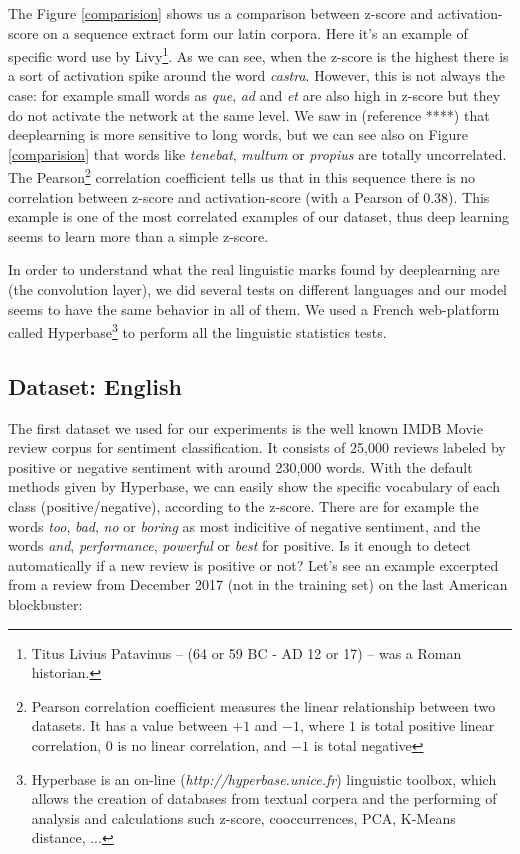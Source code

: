 The Figure \ref{comparision} shows us a comparison between z-score and activation-score on a sequence extract form our latin corpora. Here it's an example of specific word use by Livy\footnote{Titus Livius Patavinus -- (64 or 59 BC - AD 12 or 17) -- was a Roman historian.}. As we can see, when the z-score is the highest there is a sort of activation spike around the word \textit{castra}. However, this is not always the case: for example small words as \textit{que}, \textit{ad} and \textit{et} are also high in z-score but they do not activate the network at the same level. We saw in (reference ****) that deeplearning is more sensitive to long words, but we can see also on Figure \ref{comparision} that words like \textit{tenebat}, \textit{multum} or \textit{propius} are totally uncorrelated. The Pearson\footnote{Pearson correlation coefficient measures the linear relationship between two datasets. It has a value between $+1$ and $-1$, where $1$ is total positive linear correlation, $0$ is no linear correlation, and $-1$ is total negative} correlation coefficient tells us that in this sequence there is no correlation between z-score and activation-score (with a Pearson of 0.38). This example is one of the most correlated examples of our dataset, thus deep learning seems to learn more than a simple z-score.

In order to understand what the real linguistic marks found by deeplearning are (the convolution layer), we did several tests on different languages and our model seems to have the same behavior in all of them. We used a French web-platform called Hyperbase\footnote{Hyperbase is an on-line (\textit{http://hyperbase.unice.fr}) linguistic toolbox, which allows the creation of databases from textual corpera and the performing of analysis and calculations such z-score, cooccurrences, PCA, K-Means distance, ... } to perform all the linguistic statistics tests. 

\subsection{Dataset: English}

The first dataset we used for our experiments is the well known IMDB Movie review corpus for sentiment classification. It consists of 25,000 reviews labeled by positive or negative sentiment with around 230,000 words. With the default methods given by Hyperbase, we can easily show the specific vocabulary of each class (positive/negative), according to the z-score. There are for example the words \textit{too}, \textit{bad}, \textit{no} or \textit{boring} as most indicitive of negative sentiment, and the words \textit{and}, \textit{performance}, \textit{powerful} or \textit{best} for positive. 
Is it enough to detect automatically if a new review is positive or not? Let's see an example excerpted from a review from December 2017 (not in the training set) on the last American blockbuster:


